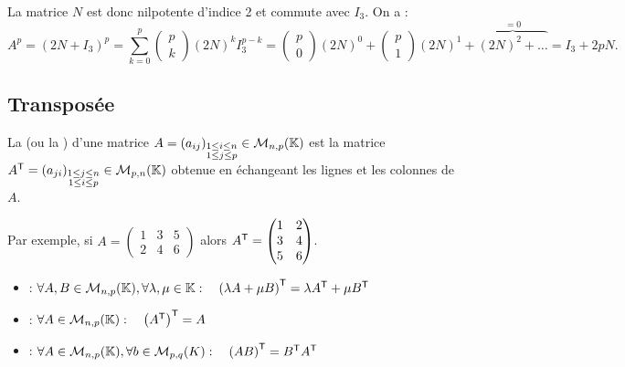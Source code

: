 \documentclass{book}
\begin{document}
\begin{Exemple}
\begin{Demonstration}
La matrice $N$ est donc nilpotente d'indice 2 et commute avec $I_3$. On a :
$$A^p= (2N +I_3 )^p=\sum_{k=0}^p\begin{pmatrix}
p\\k
\end{pmatrix} (2N)^{k}I_3^{p-k}=\begin{pmatrix}
p\\0
\end{pmatrix}(2N)^{0}+\begin{pmatrix}
p\\1
\end{pmatrix}(2N)^{1}+\overbrace{(2N)^{2}+\dots}^{=0}=I_3+2pN.$$
\end{Demonstration}
\end{Exemple}
\subsection{Transposée}
\begin{Definition}[Transposée]
La  (ou la ) d'une matrice $A=(a_{ij})_{\substack{1\leq i\leq n\\1\leq j\leq p}}\in \mathcal{M}_{n,p}(\mathbb{K})$ est la matrice $A^{\mathsf {T}}=(a_{ji})_{\substack{1\leq j\leq n\\1\leq i\leq p}}\in\mathcal{M}_{p,n}(\mathbb{K})$ obtenue en échangeant les lignes et les colonnes de $A$.
\end{Definition}
\begin{Exemple}
Par exemple, si  $A={\begin{pmatrix}1&3&5\\2&4&6\end{pmatrix}}$
alors $A^{\mathsf {T}}={\begin{pmatrix}1&2\\3&4\\5&6\end{pmatrix}}$.
\end{Exemple}
\begin{Proposition}[Propriétés]
\begin{itemize}
\item {} :  $\forall A, B \in \mathcal{M}_{n,p}(\mathbb{K}),\forall \lambda,\mu\in \mathbb{K} :\quad  \left(\lambda A+ \mu B\right)^{\mathsf {T}}= \lambda A^{\mathsf {T}} + \mu B^{\mathsf {T}}$
\item {} : $\forall A \in \mathcal{M}_{n,p}(\mathbb{K}): \quad \left(A^{\mathsf {T}}\right)^{\mathsf {T}}=A$
\item {} : $\forall A\in \mathcal{M}_{n,p}(\mathbb{K}),\forall b\in \mathcal{M}_{p,q}(K) :\quad  \left(AB\right)^{\mathsf {T}}= B^{\mathsf {T}} A^{\mathsf {T}}$
\end{itemize}
\end{Proposition}
\end{document}
